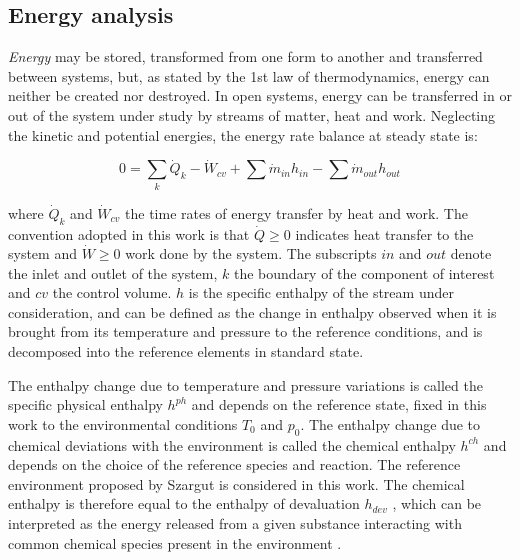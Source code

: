 \documentclass[final,times,3p]{elsarticle}
\begin{document}
	\subsection{Energy analysis}
	\label{subsec:energy_analysis}
		
	\emph{Energy} may be stored, transformed from one form to another and transferred between systems, but, as stated by the 1st law of thermodynamics, energy can neither be created nor destroyed. In open systems, energy can be transferred in or out of the system under study by streams of matter, heat and work. Neglecting the kinetic and potential energies, the energy rate balance at steady state is:
	
	\begin{equation}
	0=\sum_k \dot{Q}_{k}-\dot{W}_{cv} + \sum \dot{m}_{in} h_{in} - \sum \dot{m}_{out} h_{out}
	\end{equation}
	
	where $\dot{Q}_{k}$ and $\dot{W}_{cv}$ the time rates of energy transfer by heat and work. The convention adopted in this work is that $\dot{Q}\ge0$ indicates heat transfer to the system and $\dot{W}\ge0$ work done by the system. The subscripts $in$ and $out$ denote the inlet and outlet of the system, $k$ the boundary of the component of interest and $cv$ the control volume. $h$ is the specific enthalpy of the stream under consideration, and can be defined as the change in enthalpy observed when it is brought from its temperature and pressure to the reference conditions, and is decomposed into the reference elements in standard state. 
	
	
	The enthalpy change due to temperature and pressure variations is called the specific physical enthalpy $h^{ph}$ and depends on the reference state, fixed in this work to the environmental conditions $T_0$ and $p_0$. The enthalpy change due to chemical deviations with the environment is called the chemical enthalpy $h^{ch}$ and depends on the choice of the reference species and reaction. The reference environment proposed by Szargut is considered in this work. The chemical enthalpy is therefore equal to the enthalpy of devaluation $h_{dev}$ \cite{Kotas1995}, which can be interpreted as the energy released from a given substance interacting with common chemical species present in the environment \cite{Szargut1988}. 
	
\end{document}

